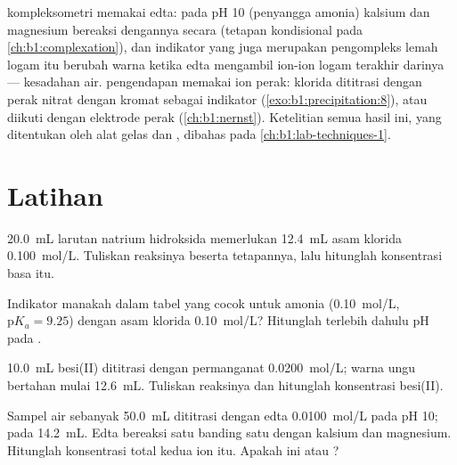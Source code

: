  kompleksometri memakai edta: pada pH 10 (penyangga amonia)
kalsium dan magnesium bereaksi dengannya secara  (tetapan
kondisional pada \cref{ch:b1:complexation}), dan indikator yang juga
merupakan pengompleks lemah logam itu berubah warna ketika edta mengambil
ion-ion logam terakhir darinya ---  kesadahan air. 
pengendapan memakai ion perak: klorida dititrasi dengan perak nitrat
dengan kromat sebagai indikator (\cref{exo:b1:precipitation:8}), atau
diikuti dengan elektrode perak (\cref{ch:b1:nernst}). Ketelitian semua
hasil ini, yang ditentukan oleh alat gelas dan , dibahas
pada \cref{ch:b1:lab-techniques-1}.

\section{Latihan}

\begin{exercise}[$\star$]\label{exo:b1:titration-methods:1}
\qty{20.0}{mL} larutan natrium hidroksida memerlukan \qty{12.4}{mL} asam
klorida \qty{0.100}{mol/L}. Tuliskan reaksinya beserta tetapannya, lalu
hitunglah konsentrasi basa itu.
\end{exercise}

\begin{exercise}[$\star$]\label{exo:b1:titration-methods:2}
Indikator manakah dalam tabel yang cocok untuk  amonia
(\qty{0.10}{mol/L}, $\mathrm{p}K_a = 9.25$) dengan asam klorida
\qty{0.10}{mol/L}? Hitunglah terlebih dahulu pH pada .
\end{exercise}

\begin{exercise}[$\star$]\label{exo:b1:titration-methods:3}
\qty{10.0}{mL} besi(II) dititrasi dengan permanganat \qty{0.0200}{mol/L};
warna ungu bertahan mulai \qty{12.6}{mL}. Tuliskan reaksinya dan
hitunglah konsentrasi besi(II).
\end{exercise}

\begin{exercise}[$\star$]\label{exo:b1:titration-methods:4}
Sampel air sebanyak \qty{50.0}{mL} dititrasi dengan edta
\qty{0.0100}{mol/L} pada pH 10;  pada \qty{14.2}{mL}. Edta
bereaksi satu banding satu dengan kalsium dan magnesium. Hitunglah
konsentrasi total kedua ion itu. Apakah ini  atau
?
\end{exercise}

